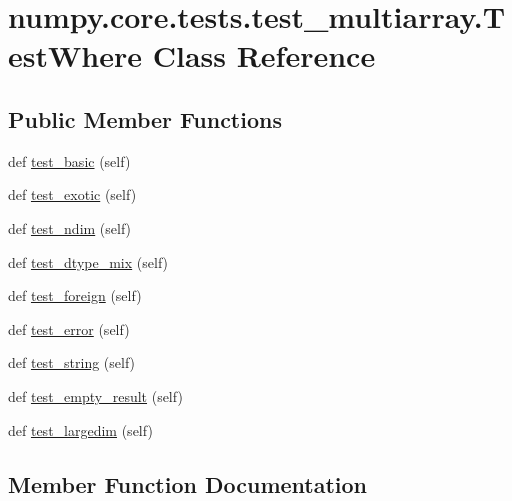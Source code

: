 \hypertarget{classnumpy_1_1core_1_1tests_1_1test__multiarray_1_1TestWhere}{}\section{numpy.\+core.\+tests.\+test\+\_\+multiarray.\+Test\+Where Class Reference}
\label{classnumpy_1_1core_1_1tests_1_1test__multiarray_1_1TestWhere}
\subsection*{Public Member Functions}
\begin{DoxyCompactItemize}
\item 
def \hyperlink{classnumpy_1_1core_1_1tests_1_1test__multiarray_1_1TestWhere_a5163fcb7285bb5f1372df7fde6ebab18}{test\+\_\+basic} (self)
\item 
def \hyperlink{classnumpy_1_1core_1_1tests_1_1test__multiarray_1_1TestWhere_a43253044088d8ca13f19ebb9604b786a}{test\+\_\+exotic} (self)
\item 
def \hyperlink{classnumpy_1_1core_1_1tests_1_1test__multiarray_1_1TestWhere_a55fc656d1de3ad6e24afe49fa36e8327}{test\+\_\+ndim} (self)
\item 
def \hyperlink{classnumpy_1_1core_1_1tests_1_1test__multiarray_1_1TestWhere_a662ef28e3b8ee40d0a19380abb7e4018}{test\+\_\+dtype\+\_\+mix} (self)
\item 
def \hyperlink{classnumpy_1_1core_1_1tests_1_1test__multiarray_1_1TestWhere_a9ec028ea9f2923f33d04633ba3e20375}{test\+\_\+foreign} (self)
\item 
def \hyperlink{classnumpy_1_1core_1_1tests_1_1test__multiarray_1_1TestWhere_a0d9b81c682cb7bcd0dea5c6dd27db684}{test\+\_\+error} (self)
\item 
def \hyperlink{classnumpy_1_1core_1_1tests_1_1test__multiarray_1_1TestWhere_a8d8ae6d9e3d0e7a37de675761d6f2e2e}{test\+\_\+string} (self)
\item 
def \hyperlink{classnumpy_1_1core_1_1tests_1_1test__multiarray_1_1TestWhere_aca4d6dd688c496ee5873e221ced12b1b}{test\+\_\+empty\+\_\+result} (self)
\item 
def \hyperlink{classnumpy_1_1core_1_1tests_1_1test__multiarray_1_1TestWhere_a00e44f18743b0537231dd9eabd7953d3}{test\+\_\+largedim} (self)
\end{DoxyCompactItemize}


\subsection{Member Function Documentation}
\mbox{\label{classnumpy_1_1core_1_1tests_1_1test__multiarray_1_1TestWhere_a5163fcb7285bb5f1372df7fde6ebab18}} 
